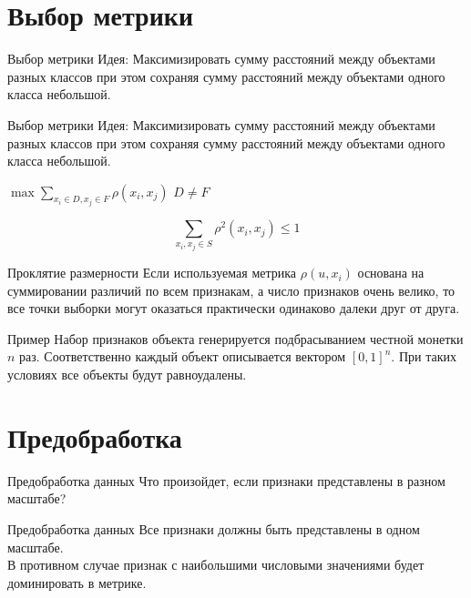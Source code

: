 \documentclass[10pt]{beamer}
\begin{document}
\section{Выбор метрики}

\begin{frame}{Выбор метрики}
	\alert{Идея}: Максимизировать сумму расстояний между объектами разных классов
	при этом сохраняя сумму расстояний между объектами одного класса небольшой.\\
\end{frame}

\begin{frame}{Выбор метрики}
	\alert{Идея}: Максимизировать сумму расстояний между объектами разных классов
	при этом сохраняя сумму расстояний между объектами одного класса небольшой.\\
	\bigbreak
	\begin{center}
    	${\max \sum\limits_{x_i \in D, x_j \in F} \rho(x_i, x_j) }$ \hspace{5mm} $D \neq F$	
	\end{center}
	\bigbreak
	$${\sum\limits_{x_i, x_j \in S} \rho^2(x_i, x_j) \leq 1 }$$
\end{frame}

\begin{frame}{Проклятие размерности}
	\centering
	Если используемая метрика ${\rho(u, x_i)}$ основана на суммировании различий по всем признакам, а число признаков очень велико,
	то все точки выборки могут оказаться практически одинаково далеки друг от друга.\\
\end{frame}

\begin{frame}{Пример}
	Набор признаков объекта генерируется подбрасыванием честной монетки $n$ раз. Соответственно
	каждый объект описывается вектором $[0, 1]^n$. При таких условиях все объекты будут равноудалены.
\end{frame}

\section{Предобработка}

\begin{frame}{Предобработка данных}
	\centering
	Что произойдет, если признаки представлены в разном масштабе?
\end{frame}

\begin{frame}{Предобработка данных}
	Все признаки должны быть представлены \alert{в одном масштабе}. \\
	В противном случае признак с наибольшими числовыми значениями будет доминировать в метрике.
\end{frame}
\end{document}
